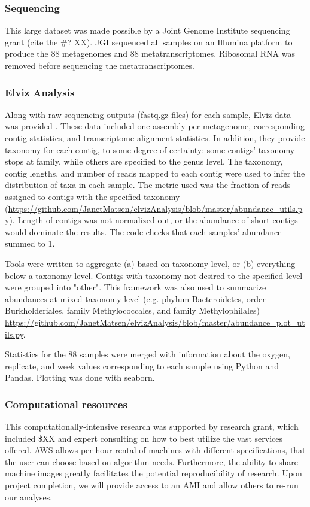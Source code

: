 \subsubsection{Sequencing}
This large dataset was made possible by a Joint Genome Institute sequencing grant (cite the \#? XX).
JGI sequenced all samples on an Illumina platform to produce the 88 metagenomes and 88 metatranscriptomes.
Ribosomal RNA was removed before sequencing the metatranscriptomes.

\subsubsection{Elviz Analysis}
Along with raw sequencing outputs (fastq.gz files) for each sample, Elviz data was provided \cite{cantor2015}.
These data included one assembly per metagenome, corresponding contig statistics, and transcriptome alignment statistics.
In addition, they provide taxonomy for each contig, to some degree of certainty: some contigs' taxonomy stops at family, while others are specified to the genus level.
The taxonomy, contig lengths, and number of reads mapped to each contig were used to infer the distribution of taxa in each sample.
The metric used was the fraction of reads assigned to contigs with the specified taxonomy (\url{https://github.com/JanetMatsen/elvizAnalysis/blob/master/abundance_utils.py}).
Length of contigs was not normalized out, or the abundance of short contigs would dominate the results.
The code checks that each samples' abundance summed to 1.

Tools were written to aggregate (a) based on taxonomy level, or (b) everything below a taxonomy level.
Contigs with taxonomy not desired to the specified level were grouped into "other".
This framework was also used to summarize abundances at mixed taxonomy level (e.g. phylum Bacteroidetes, order Burkholderiales, family Methylococcales, and family Methylophilales) \url{https://github.com/JanetMatsen/elvizAnalysis/blob/master/abundance_plot_utils.py}.

Statistics for the 88 samples were merged with information about the oxygen, replicate, and week values corresponding to each sample using Python and Pandas.
Plotting was done with seaborn.

\subsubsection{Computational resources}
This computationally-intensive research was supported by research grant, which included \$XX and expert consulting on how to best utilize the vast services offered.
AWS allows per-hour rental of machines with different specifications, that the user can choose based on algorithm needs.
Furthermore, the ability to share machine images greatly facilitates the potential reproducibility of research.
Upon project completion, we will provide access to an AMI and allow others to re-run our analyses.

